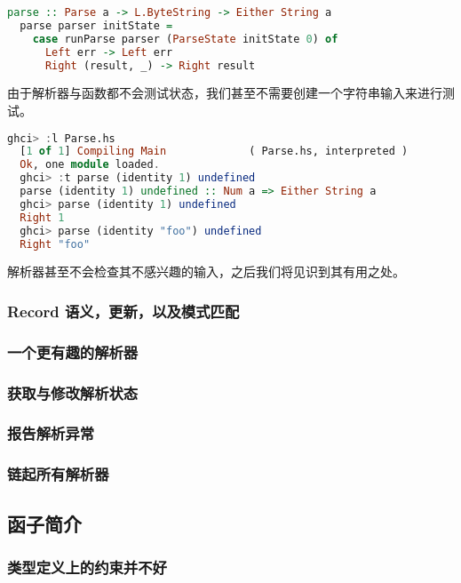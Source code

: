 \documentclass[./main.tex]{subfiles}
\begin{document}
\begin{lstlisting}[language=Haskell]
  parse :: Parse a -> L.ByteString -> Either String a
  parse parser initState =
    case runParse parser (ParseState initState 0) of
      Left err -> Left err
      Right (result, _) -> Right result
\end{lstlisting}

由于解析器与函数都不会测试状态，我们甚至不需要创建一个字符串输入来进行测试。

\begin{lstlisting}[language=Haskell]
  ghci> :l Parse.hs
  [1 of 1] Compiling Main             ( Parse.hs, interpreted )
  Ok, one module loaded.
  ghci> :t parse (identity 1) undefined
  parse (identity 1) undefined :: Num a => Either String a
  ghci> parse (identity 1) undefined
  Right 1
  ghci> parse (identity "foo") undefined
  Right "foo"
\end{lstlisting}

解析器甚至不会检查其不感兴趣的输入，之后我们将见识到其有用之处。

\subsubsection*{Record 语义，更新，以及模式匹配}

\subsubsection*{一个更有趣的解析器}

\subsubsection*{获取与修改解析状态}

\subsubsection*{报告解析异常}

\subsubsection*{链起所有解析器}

\subsection*{函子简介}

\subsubsection*{类型定义上的约束并不好}
\end{document}
